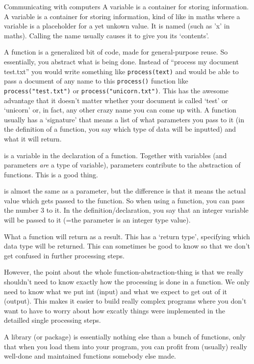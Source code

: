 \documentclass[10pt]{beamer}
\begin{document}
\begin{frame}[allowframebreaks]{Communicating with computers}
 A variable is a container for storing information. A variable is a container for storing information, kind of like in maths where a variable is a placeholder for a yet unkown value. It is named (such as 'x' in maths). Calling the name usually causes it to give you its `contents'.

 A function is a generalized bit of code, made for general-purpose reuse. So essentially, you abstract what is being done. Instead of ``process my document test.txt'' you would write something like \texttt{process(text)} and would be able to pass a document of any name to this \texttt{process()} function like \texttt{process("test.txt")} or \texttt{process("unicorn.txt")}. This has the awesome advantage that it doesn't matter whether your document is called `test' or `unicorn' or, in fact, any other crazy name you can come up with. A function usually has a `signature' that means a list of what parameters you pass to it (in the definition of a function, you say which type of data will be inputted) and what it will return.

 is a variable in the declaration of a function. Together with variables (and parameters \emph{are} a type of variable), parameters contribute to the abstraction of functions. This is a good thing. 

 is almost the same as a parameter, but the difference is that it means the actual value which gets passed to the function. So when using a function, you can pass the number 3 to it. In the definition/declaration, you say that an integer variable will be passed to it (=the parameter is an integer type value). 

 What a function will return as a result. This has a `return type', specifying which data type will be returned.  This can sometimes be good to know so that we don't get confused in further processing steps. 

However, the point about the whole function-abstraction-thing is that we really shouldn't need to know exactly how the processing is done in a function. We only need to know what we put int (input) and what we expect to get out of it (output). This makes it easier to build really complex programs where you don't want to have to worry about how excatly things were implemented in the detailled single processing steps.


 A library (or package) is essentially nothing else than a bunch of functions, only that when you load them into your program, you can profit from (usually) really well-done and maintained functions somebody else made. 


\end{frame}
\end{document}
